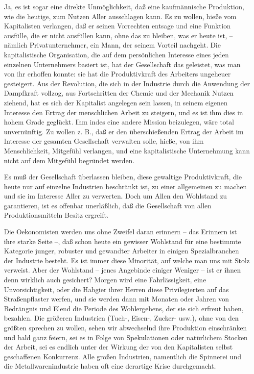 \documentclass{scrbook}
\begin{document}
Ja, es ist sogar eine direkte Unmöglichkeit, daß eine kaufmännische Produktion, wie die heutige, zum Nutzen Aller ausschlagen kann. Es zu wollen, hieße vom Kapitalisten verlangen, daß er seinen Vorrechten entsage und eine Funktion ausfülle, die er nicht ausfüllen kann, ohne das zu bleiben, was er heute ist, – nämlich Privatunternehmer, ein Mann, der seinem Vorteil nachgeht. Die kapitalistische Organisation, die auf dem persönlichen Interesse eines jeden einzelnen Unternehmers basiert ist, hat der Gesellschaft das geleistet, was man von ihr erhoffen konnte: sie hat die Produktivkraft des Arbeiters ungeheuer gesteigert. Aus der Revolution, die sich in der Industrie durch die Anwendung der Dampfkraft vollzog, aus Fortschritten der Chemie und der Mechanik Nutzen ziehend, hat es sich der Kapitalist angelegen sein lassen, in seinem eigenen Interesse den Ertrag der menschlichen Arbeit zu steigern, und es ist ihm dies in hohem Grade geglückt. Ihm indes eine andere Mission beizulegen‚ wäre total unvernünftig. Zu wollen z. B., daß er den überschießenden Ertrag der Arbeit im Interesse der gesamten Gesellschaft verwalten solle, hieße, von ihm Menschlichkeit, Mitgefühl verlangen, und eine kapitalistische Unternehmung kann nicht auf dem Mitgefühl begründet werden.

Es muß der Gesellschaft überlassen bleiben, diese gewaltige Produktivkraft, die heute nur auf einzelne Industrien beschränkt ist, zu einer allgemeinen zu machen und sie im Interesse Aller zu verwerten. Doch um Allen den Wohlstand zu garantieren, ist es offenbar unerläßlich, daß die Gesellschaft von allen Produktionsmitteln Besitz ergreift.

Die Oekonomisten werden uns ohne Zweifel daran erinnern – das Erinnern ist ihre starke Seite –, daß schon heute ein gewisser Wohlstand für eine bestimmte Kategorie junger, robuster und gewandter Arbeiter in einigen Spezialbranchen der Industrie besteht. Es ist immer diese Minorität, auf welche man uns mit Stolz verweist. Aber der Wohlstand – jenes Angebinde einiger Weniger – ist er ihnen denn wirklich auch gesichert? Morgen wird eine Fahrlässigkeit, eine Unvorsichtigkeit, oder die Habgier ihrer Herren diese Privilegierten auf das Straßenpflaster werfen, und sie werden dann mit Monaten oder Jahren von Bedrängnis und Elend die Periode des Wohlergehens, der sie sich erfreut haben, bezahlen. Die größeren Industrien (Tuch-, Eisen-, Zucker- usw.), ohne von den größten sprechen zu wollen, sehen wir abwechselnd ihre Produktion einschränken und bald ganz feiern, sei es in Folge von Spekulationen oder natürlichem Stocken der Arbeit, sei es endlich unter der Wirkung der von den Kapitalisten selbst geschaffenen Konkurrenz. Alle großen Industrien, namentlich die Spinnerei und die Metallwarenindustrie haben oft eine derartige Krise durchgemacht.
\end{document}
